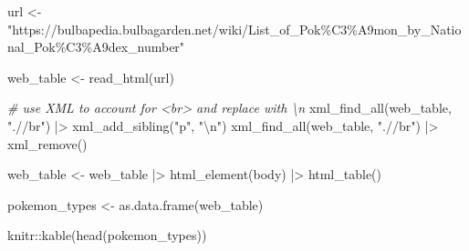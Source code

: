 \documentclass[
]{article}
\newenvironment{Shaded}{\begin{snugshade}}{\end{snugshade}}
\newcommand{\CommentTok}[1]{\textcolor[rgb]{0.56,0.35,0.01}{\textit{#1}}}
\newcommand{\FunctionTok}[1]{\textcolor[rgb]{0.00,0.00,0.00}{#1}}
\newcommand{\NormalTok}[1]{#1}
\newcommand{\OtherTok}[1]{\textcolor[rgb]{0.56,0.35,0.01}{#1}}
\newcommand{\SpecialCharTok}[1]{\textcolor[rgb]{0.00,0.00,0.00}{#1}}
\newcommand{\StringTok}[1]{\textcolor[rgb]{0.31,0.60,0.02}{#1}}
\begin{document}
\begin{Shaded}
\begin{Highlighting}[]
\NormalTok{url }\OtherTok{\textless{}{-}} \StringTok{"https://bulbapedia.bulbagarden.net/wiki/List\_of\_Pok\%C3\%A9mon\_by\_National\_Pok\%C3\%A9dex\_number"}

\NormalTok{web\_table }\OtherTok{\textless{}{-}} \FunctionTok{read\_html}\NormalTok{(url) }

\CommentTok{\# use XML to account for \textless{}br\textgreater{} and replace with \textquotesingle{}\textbackslash{}n\textquotesingle{}}
\FunctionTok{xml\_find\_all}\NormalTok{(web\_table, }\StringTok{".//br"}\NormalTok{) }\SpecialCharTok{|\textgreater{}} 
  \FunctionTok{xml\_add\_sibling}\NormalTok{(}\StringTok{"p"}\NormalTok{, }\StringTok{"}\SpecialCharTok{\textbackslash{}n}\StringTok{"}\NormalTok{)}
\FunctionTok{xml\_find\_all}\NormalTok{(web\_table, }\StringTok{".//br"}\NormalTok{) }\SpecialCharTok{|\textgreater{}} 
  \FunctionTok{xml\_remove}\NormalTok{() }

\NormalTok{web\_table }\OtherTok{\textless{}{-}} 
\NormalTok{  web\_table }\SpecialCharTok{|\textgreater{}} 
  \FunctionTok{html\_element}\NormalTok{(}\StringTok{\textquotesingle{}body\textquotesingle{}}\NormalTok{) }\SpecialCharTok{|\textgreater{}} 
  \FunctionTok{html\_table}\NormalTok{()}

\NormalTok{pokemon\_types }\OtherTok{\textless{}{-}} \FunctionTok{as.data.frame}\NormalTok{(web\_table)}

\NormalTok{knitr}\SpecialCharTok{::}\FunctionTok{kable}\NormalTok{(}\FunctionTok{head}\NormalTok{(pokemon\_types))}
\end{Highlighting}
\end{Shaded}
\end{document}
